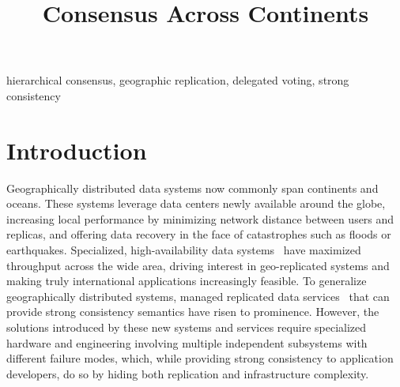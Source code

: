 \documentclass[10pt,conference]{IEEEtran}
\begin{document}
\title{Consensus Across Continents}

\author{
}

\maketitle

\begin{abstract}
    
\end{abstract}

\begin{IEEEkeywords}
hierarchical consensus, geographic replication, delegated voting, strong consistency
\end{IEEEkeywords}



\section{Introduction}
\label{section:intro}

Geographically distributed data systems now commonly span continents and oceans.
These systems leverage data centers newly available around the globe,
increasing local performance by minimizing network distance between users and
replicas, and offering data recovery in the face of catastrophes such as floods or
earthquakes.
Specialized, high-availability data systems~\cite{megastore,tao,akkio,dynamic_placement}
have maximized throughput across the wide area, driving interest in
geo-replicated systems and making truly international applications increasingly
feasible.
To generalize geographically distributed systems, managed replicated data
services~\cite{spanner,aurora,cockroachdb} that can provide strong consistency semantics
have risen to prominence.
However, the solutions introduced by these new systems and services require specialized
hardware and engineering involving multiple independent subsystems with different
failure modes, which, while providing strong consistency to application developers, do
so by hiding both replication and infrastructure complexity.
\end{document}
